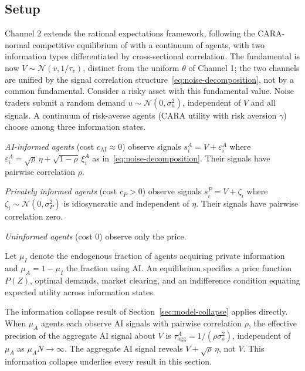 \label{sec:channel2}

\subsection{Setup}

Channel 2 extends the \citet{grossman1980} rational expectations framework, following the CARA-normal competitive equilibrium of \citet{verrecchia1982} with a continuum of agents, with two information types differentiated by cross-sectional correlation. The fundamental is now $V \sim \mathcal{N}(\bar{v}, 1/\tau_v)$, distinct from the uniform $\theta$ of Channel 1; the two channels are unified by the signal correlation structure~\eqref{eq:noise-decomposition}, not by a common fundamental. Consider a risky asset with this fundamental value. Noise traders submit a random demand $u \sim \mathcal{N}(0, \sigma_u^2)$, independent of $V$ and all signals. A continuum of risk-averse agents (CARA utility with risk aversion $\gamma$) choose among three information states.

\emph{AI-informed agents} (cost $c_{\text{AI}} \approx 0$) observe signals $s_i^A = V + \varepsilon_i^A$ where $\varepsilon_i^A = \sqrt{\rho}\,\eta + \sqrt{1-\rho}\,\xi_i^A$ as in~\eqref{eq:noise-decomposition}. Their signals have pairwise correlation $\rho$.

\emph{Privately informed agents} (cost $c_P > 0$) observe signals $s_i^P = V + \zeta_i$ where $\zeta_i \sim \mathcal{N}(0, \sigma_P^2)$ is idiosyncratic and independent of $\eta$. Their signals have pairwise correlation zero.

\emph{Uninformed agents} (cost 0) observe only the price.

Let $\mu_I$ denote the endogenous fraction of agents acquiring private information and $\mu_A = 1 - \mu_I$ the fraction using AI. An equilibrium specifies a price function $P(Z)$, optimal demands, market clearing, and an indifference condition equating expected utility across information states.

The information collapse result of Section~\ref{sec:model-collapse} applies directly. When $\mu_A$ agents each observe AI signals with pairwise correlation $\rho$, the effective precision of the aggregate AI signal about $V$ is $\tau_{\text{agg}}^A = 1/(\rho\sigma_s^2)$, independent of $\mu_A$ as $\mu_A N \to \infty$. The aggregate AI signal reveals $V + \sqrt{\rho}\,\eta$, not $V$. This information collapse underlies every result in this section.

